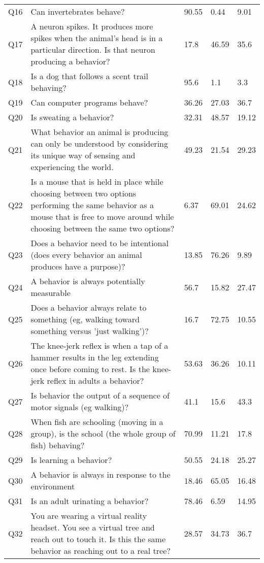 \begin{longtable}{p{1cm} p{12cm} || p{1cm} p{1cm} p{1cm}}
Q16 & Can invertebrates behave? & 90.55 & 0.44 & 9.01 \\ 
Q17 & A neuron spikes. It produces more spikes when the animal’s head is in a particular direction. Is that neuron producing a behavior? & 17.8 & 46.59 & 35.6 \\ 
Q18 & Is a dog that follows a scent trail behaving? & 95.6 & 1.1 & 3.3 \\ 
Q19 & Can computer programs behave? & 36.26 & 27.03 & 36.7 \\ 
Q20 & Is sweating a behavior? & 32.31 & 48.57 & 19.12 \\ 
Q21 & What behavior an animal is producing can only be understood by considering its unique way of sensing and experiencing the world. & 49.23 & 21.54 & 29.23 \\ 
Q22 & Is a mouse that is held in place while choosing between two options performing the same behavior as a mouse that is free to move around while choosing between the same two options? & 6.37 & 69.01 & 24.62 \\ 
Q23 & Does a behavior need to be intentional (does every behavior an animal produces have a purpose)? & 13.85 & 76.26 & 9.89 \\ 
Q24 & A behavior is always potentially measurable & 56.7 & 15.82 & 27.47 \\ 
Q25 & Does a behavior always relate to something (eg, walking toward something versus 'just walking')? & 16.7 & 72.75 & 10.55 \\ 
Q26 & The knee-jerk reflex is when a tap of a hammer results in the leg extending once before coming to rest. Is the knee-jerk reflex in adults a behavior? & 53.63 & 36.26 & 10.11 \\ 
Q27 & Is behavior the output of a sequence of motor signals (eg walking)? & 41.1 & 15.6 & 43.3 \\ 
Q28 & When fish are schooling (moving in a group), is the school (the whole group of fish) behaving? & 70.99 & 11.21 & 17.8 \\ 
Q29 & Is learning a behavior? & 50.55 & 24.18 & 25.27 \\ 
Q30 & A behavior is always in response to the environment & 18.46 & 65.05 & 16.48 \\ 
Q31 & Is an adult urinating a behavior? & 78.46 & 6.59 & 14.95 \\ 
Q32 & You are wearing a virtual reality headset. You see a virtual tree and reach out to touch it. Is this the same behavior as reaching out to a real tree? & 28.57 & 34.73 & 36.7 \\ 

\end{longtable}
